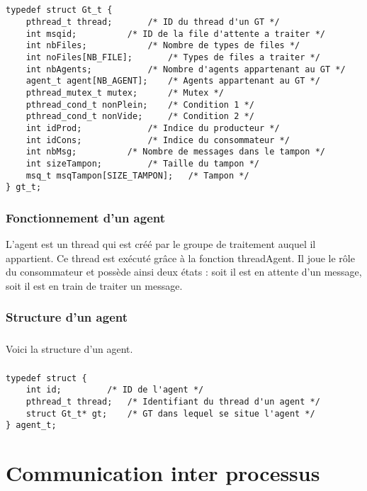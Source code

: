 \documentclass{report}
\begin{document}
			\paragraph{}
				\lstset{language=C}
				\begin{lstlisting}
typedef struct Gt_t {
	pthread_t thread; 		/* ID du thread d'un GT */
	int msqid;			/* ID de la file d'attente a traiter */
	int nbFiles;	 		/* Nombre de types de files */
	int noFiles[NB_FILE]; 		/* Types de files a traiter */
	int nbAgents; 			/* Nombre d'agents appartenant au GT */
	agent_t agent[NB_AGENT]; 	/* Agents appartenant au GT */
	pthread_mutex_t mutex; 		/* Mutex */
	pthread_cond_t nonPlein; 	/* Condition 1 */
	pthread_cond_t nonVide; 	/* Condition 2 */
	int idProd; 			/* Indice du producteur */
	int idCons; 			/* Indice du consommateur */
	int nbMsg;			/* Nombre de messages dans le tampon */
	int sizeTampon; 		/* Taille du tampon */
	msq_t msqTampon[SIZE_TAMPON]; 	/* Tampon */
} gt_t;
				\end{lstlisting}
		\subsection{Fonctionnement d'un agent}
			L'agent est un thread qui est créé par le groupe de traitement auquel il appartient. Ce thread est exécuté grâce à la fonction threadAgent. Il joue le rôle du consommateur et possède ainsi deux états : soit il est en attente d'un message, soit il est en train de traiter un message.
		\subsection{Structure d'un agent}
			\paragraph{}
				Voici la structure d'un agent.
			\paragraph{}
				\lstset{language=C}
				\begin{lstlisting}
typedef struct {
	int id;			/* ID de l'agent */
	pthread_t thread;	/* Identifiant du thread d'un agent */
	struct Gt_t* gt;	/* GT dans lequel se situe l'agent */
} agent_t;
				\end{lstlisting}
	\newpage

\chapter{Communication inter processus}
\end{document}
